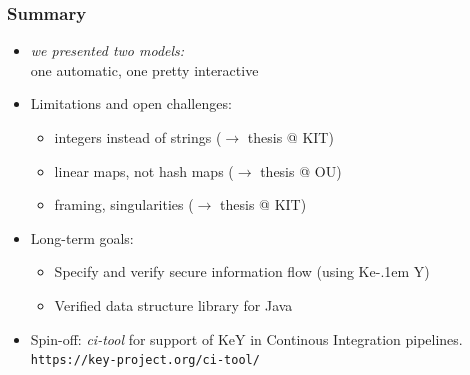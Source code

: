 \documentclass{beamer}
\newcommand{\KeY}{Ke\kern-.1em Y}
\begin{document}
\begin{frame}
  \frametitle{Summary}
  \begin{itemize} \itemsep3ex
  \item \emph{we presented two models:} \\
    one automatic, one pretty interactive
  \item Limitations and open challenges:
    \begin{itemize}
    \item integers instead of strings ($\to$ thesis @ KIT)
    \item linear maps, not hash maps ($\to$ thesis @ OU)
    \item framing, singularities ($\to$ thesis @ KIT)
    \end{itemize}
  \item Long-term goals:
    \begin{itemize}
    \item Specify and verify secure information flow (using \KeY)
    \item Verified data structure library for Java
    \end{itemize}
    \item Spin-off: \emph{ci-tool} for support of KeY in Continous Integration
     pipelines. \small
    \texttt{https://key-project.org/ci-tool/}
  \end{itemize}
\end{frame}
\end{document}
